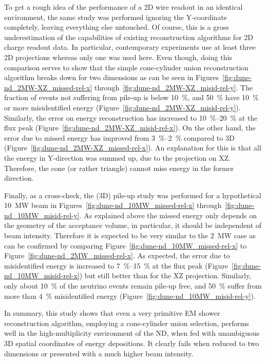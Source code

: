 To get a rough idea of the performance of a 2D wire readout in an identical environment, the same study was performed ignoring the Y-coordinate completely, leaving everything else untouched.
Of course, this is a gross underestimation of the capabilities of existing reconstruction algorithms for 2D charge readout data.
In particular, contemporary experiments use at least three 2D projections whereas only one was used here.
Even though, doing this comparison serves to show that the simple cone-cylinder union reconstruction algorithm breaks down for two dimensions as can be seen in Figures~\ref{fig:dune-nd_2MW-XZ_missed-rel-x} through~\ref{fig:dune-nd_2MW-XZ_misid-rel-y}.
The fraction of events not suffering from pile-up is below \SI{10}{\percent}, and \SI{50}{\percent} have \SI{10}{\percent} or more misidentified energy (Figure~\ref{fig:dune-nd_2MW-XZ_misid-rel-y}).
Similarly, the error on energy reconstruction has increased to \SIrange{10}{20}{\percent} at the flux peak (Figure~\ref{fig:dune-nd_2MW-XZ_misid-rel-x}).
On the other hand, the error due to missed energy has improved from \SIrange{3}{2}{\percent} compared to 3D (Figure~\ref{fig:dune-nd_2MW-XZ_missed-rel-x}).
An explanation for this is that all the energy in Y-direction was summed up, due to the projection on XZ.
Therefore, the cone (or rather triangle) cannot miss energy in the former direction.

Finally, as a cross-check, the (3D) pile-up study was performed for a hypothetical \SI{10}{\mega\watt} beam in Figures~\ref{fig:dune-nd_10MW_missed-rel-x} through~\ref{fig:dune-nd_10MW_misid-rel-y}.
As explained above the missed energy only depends on the geometry of the acceptance volume, in particular, it should be independent of beam intensity.
Therefore it is expected to be very similar to the \SI{2}{\mega\watt} case as can be confirmed by comparing Figure~\ref{fig:dune-nd_10MW_missed-rel-x} to Figure~\ref{fig:dune-nd_2MW_missed-rel-x}.
As expected, the error due to misidentified energy is increased to \SIrange{7}{15}{\percent} at the flux peak (Figure~\ref{fig:dune-nd_10MW_misid-rel-x}) but still better than for the XZ projection.
Similarly, only about \SI{10}{\percent} of the neutrino events remain pile-up free, and \SI{50}{\percent} suffer from more than \SI{4}{\percent} misidentified energy (Figure~\ref{fig:dune-nd_10MW_misid-rel-y}).

In summary, this study shows that even a very primitive EM shower reconstruction algorithm, employing a cone-cylinder union selection, performs well in the high-multiplicity environment of the \dune{} ND, when fed with unambiguous 3D spatial coordinates of energy depositions.
It clearly fails when reduced to two dimensions or presented with a much higher beam intensity.

\afterpage{\clearpage}
